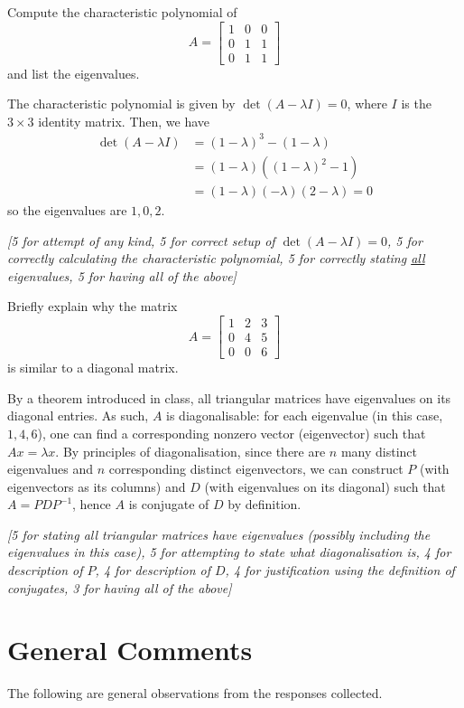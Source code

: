 \documentclass[answers,11pt]{exam}
\theoremstyle{definition}
\DeclareMathOperator{\1}{\mathbbm{1}}
\begin{document}
\begin{questions}
\question[25] Compute the characteristic polynomial of 
\begin{equation*}
A=\begin{bmatrix}
1&0&0\\
0&1&1\\
0&1&1
\end{bmatrix}
\end{equation*}
and list the eigenvalues. 
\addpoints

\begin{solution}
	The characteristic polynomial is given by $\det(A - \lambda I) = 0$, where $I$ is the $3 \times 3$ identity matrix. Then, we have
	\begin{align*}
	\det(A - \lambda I) &= (1-\lambda)^3 - (1-\lambda) \\
	&= (1-\lambda)  ( (1-\lambda)^2 - 1 ) \\
	&= (1-\lambda)(-\lambda)(2-\lambda) = 0
	\end{align*}
	so the eigenvalues are $1,0,2$.
	
	\textit{[5 for attempt of any kind, 5 for correct setup of $\det(A-\lambda I) = 0$, 5 for correctly calculating the characteristic polynomial, 5 for correctly stating \uline{all} eigenvalues, 5 for having all of the above]}
\end{solution}


\question[25] Briefly explain why the matrix 
\begin{equation*}
A=
\begin{bmatrix}
1&2&3\\
0&4&5\\
0&0&6
\end{bmatrix}
\end{equation*}
is similar to a diagonal matrix.
\addpoints

\begin{solution}
	By a theorem introduced in class, all triangular matrices have eigenvalues on its diagonal entries. As such, $A$ is diagonalisable: for each eigenvalue (in this case, $1,4,6$), one can find a corresponding nonzero vector (eigenvector) such that $Ax = \lambda x$. By principles of diagonalisation, since there are $n$ many distinct eigenvalues and $n$ corresponding distinct eigenvectors, we can construct $P$ (with eigenvectors as its columns) and $D$ (with eigenvalues on its diagonal) such that $A = PDP^{-1}$, hence $A$ is conjugate of $D$ by definition.
	
	\textit{[5 for stating all triangular matrices have eigenvalues (possibly including the eigenvalues in this case), 5 for attempting to state what diagonalisation is, 4 for description of $P$, 4 for description of $D$, 4 for justification using the definition of conjugates, 3 for having all of the above]}
\end{solution}

\end{questions}


\clearpage


\section*{General Comments}

The following are general observations from the responses collected.
\end{document}
